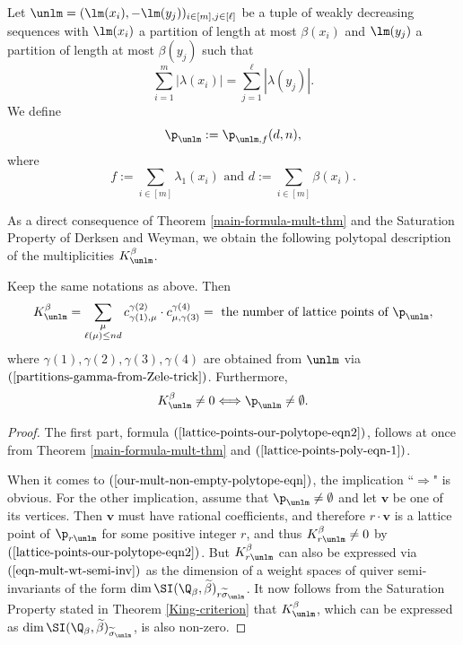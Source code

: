 \begin{defi} \label{defn-our-polytope}
Let $\unlm=(\lm(x_i), -\lm(y_j))_{i \in [m], j \in [\ell] }$ be a tuple of weakly decreasing sequences with $\lm(x_i)$ a partition of length at most $\beta(x_i)$ and $\lm(y_j)$ a partition of length at most $\beta(y_j)$ such that
$$
\sum_{i=1}^m |\lambda(x_i)|=\sum_{j=1}^{\ell} |\lambda(y_j)|.
$$
We define
\begin{equation}
\p_{\unlm}:=\p_{\unlm, f}(d,n),
\end{equation}
where 
$$
f:=\sum_{i \in [m]} \lambda_1(x_i) \text{~and~} d:=\sum_{i \in [m]} \beta(x_i). 
$$

\end{defi}

As a direct consequence of Theorem \ref{main-formula-mult-thm} and the Saturation Property of Derksen and Weyman, we obtain the following polytopal description of the multiplicities $K^{\beta}_{\unlm}$. 

\begin{prop} \label{prop-main-thm-part-1} Keep the same notations as above. Then
\begin{equation}\label{lattice-points-our-polytope-eqn2}
K^\beta_{\unlm}=\sum_{\substack{\mu \\ \ell(\mu) \leq nd}} c^{\gamma(2)}_{\gamma(1),\mu} \cdot c^{\gamma(4)}_{\mu,\gamma(3)}=\text{~the number of lattice points of~}\p_{\unlm},
\end{equation}
where $\gamma(1), \gamma(2), \gamma(3), \gamma(4)$ are obtained from $\unlm$ via $(\ref{partitions-gamma-from-Zele-trick})$. Furthermore,
\begin{equation}\label{our-mult-non-empty-polytope-eqn}
K^\beta_{\unlm} \neq 0 \Longleftrightarrow \p_{\unlm} \neq \emptyset.
\end{equation}
\end{prop}

\begin{proof} The first part, formula $(\ref{lattice-points-our-polytope-eqn2})$, follows at once from Theorem \ref{main-formula-mult-thm} and $(\ref{lattice-points-poly-eqn-1})$.

When it comes to $(\ref{our-mult-non-empty-polytope-eqn})$, the implication ``$\Longrightarrow$" is obvious. For the other implication,  assume that $\p_{\unlm} \neq \emptyset$ and let $\mathbf{v}$ be one of its vertices. Then $\mathbf{v}$ must have rational coefficients, and therefore $r\cdot \mathbf{v}$ is a lattice point of $\p_{r \unlm}$ for some positive integer $r$, and thus $K^{\beta}_{r \unlm} \neq 0$ by $(\ref{lattice-points-our-polytope-eqn2})$. But $K^{\beta}_{r \unlm}$ can also be expressed via $(\ref{eqn-mult-wt-semi-inv})$ as the dimension of a weight spaces of quiver semi-invariants  of the form $\dim \SI(\Q_\beta, \widetilde{\beta})_{r \widetilde{\sigma}_{\unlm}}$. It now follows from the Saturation Property stated in Theorem \ref{King-criterion} that $ K^{\beta}_{\unlm}$, which can be expressed as $\dim \SI(\Q_\beta, \widetilde{\beta})_{\widetilde{\sigma}_{\unlm}}$, is also non-zero. 
\end{proof}


